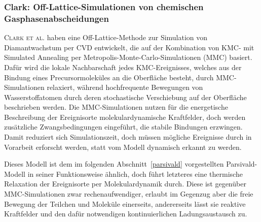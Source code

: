 \subsubsection{Clark: Off-Lattice-Simulationen von chemischen Gasphasenabscheidungen}
\textsc{Clark et al.}\cite{clark_hybrid_1996} haben eine Off-Lattice-Methode zur Simulation von Diamantwachstum per CVD entwickelt, die auf der Kombination von KMC- mit Simulated Annealing per Metropolis-Monte-Carlo-Simulationen (MMC) basiert.
Dafür wird die lokale Nachbarschaft jedes KMC-Ereignisses, welches aus der Bindung eines Precursormoleküles an die Oberfläche besteht, durch MMC-Simu\-la\-tionen relaxiert, während hochfrequente Bewegungen von Wasserstoffatomen durch deren stochastische Verschiebung auf der Oberfläche beschrieben werden.
Die MMC-Simulationen nutzen für die energetische Beschreibung der Ereignisorte molekulardynamische Kraftfelder, doch werden zusätzliche Zwangsbedingungen eingeführt, die stabile Bindungen erzwingen.
Damit reduziert sich Simulationszeit, doch müssen mögliche Ereignisse durch in Vorarbeit erforscht werden, statt vom Modell dynamisch erkannt zu werden.


Dieses Modell ist dem im folgenden Abschnitt~\ref{parsivald} vorgestellten Parsivald-Modell in seiner Funktionsweise ähnlich, doch führt letzteres eine thermische Relaxation der Ereignisorte per Molekulardynamik durch.
Diese ist gegenüber MMC-Simulationen zwar rechenaufwendiger, erlaubt im Gegenzug aber die freie Bewegung der Teilchen und Moleküle einerseits, andererseits lässt sie reaktive Kraftfelder und den dafür notwendigen kontinuierlichen Ladungsaustausch zu.

